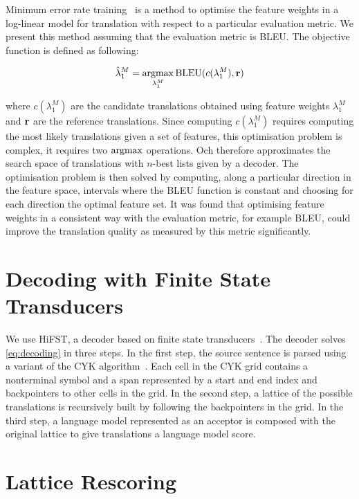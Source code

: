     Minimum error rate training~\citep{och:2003:ACL} is a method to optimise the feature weights
    in a log-linear model for translation with respect to a particular evaluation metric. We present
    this method assuming that the evaluation metric is BLEU. The objective function is defined 
    as following:

    \begin{equation}
      \hat{\lambda}_1^M = \operatorname*{argmax}_{\lambda_1^M} \mbox{BLEU}(c(\lambda_1^M), {\bf r}) 
    \end{equation}

    \noindent where $c(\lambda_1^M)$ are the candidate translations obtained using feature
    weights $\lambda_1^M$ and ${\bf r}$ are the reference translations. Since computing $c(\lambda_1^M)$
    requires computing the most likely translations given a set of features, this
    optimisation problem is complex, it requires two $\operatorname*{argmax}$ operations. Och therefore approximates the search space of translations
    with $n$-best lists given by a decoder. The optimisation problem is then solved by 
    computing, along a particular direction in the feature space, intervals where the BLEU function 
    is constant and choosing for each direction the optimal feature set. It was found
    that optimising feature weights in a consistent way with the evaluation metric, for example
    BLEU, could improve the translation quality as measured by this metric significantly.


\section{Decoding with Finite State Transducers}
\label{sec:hifst}
  
We use HiFST, a decoder based on finite state transducers~\citep{iglesias-degispert-banga-byrne:2009:NAACL}.
The decoder solves \autoref{eq:decoding} in three steps. In the first step, the source
sentence is parsed using a variant of the CYK algorithm~\citep{chappelier-rahman:1998:TAPD}. Each cell in the CYK
grid contains a nonterminal symbol and a span represented by a start and
end index and backpointers to other cells in the grid. In the second step, a lattice of the possible translations 
is recursively built by following the backpointers in the grid.
In the third step, a language model represented as an acceptor is composed
with the original lattice to give translations a language model score.

\section{Lattice Rescoring}
\label{sec:rescoring}

